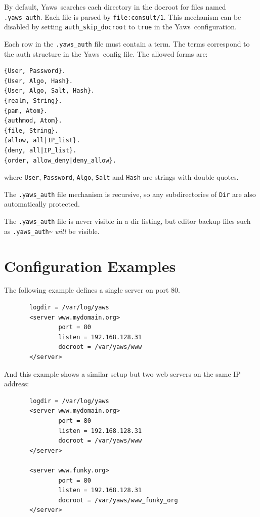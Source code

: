 \documentclass[11pt,oneside,english]{book}
\newcommand{\Yaws}            %
        {{\sc Yaws}}
\begin{document}
        By default, \Yaws\ searches each directory in the docroot for files
        named \verb+.yaws_auth+. Each file is parsed by \verb+file:consult/1+.
        This mechanism can be disabled by setting \verb+auth_skip_docroot+ to
        \verb+true+ in the \Yaws\ configuration.

        Each row in the \verb+.yaws_auth+ file must contain a term.
        The terms correspond to the auth structure in the \Yaws\ config
        file. The allowed forms are:

\begin{verbatim}
{User, Password}.
{User, Algo, Hash}.
{User, Algo, Salt, Hash}.
{realm, String}.
{pam, Atom}.
{authmod, Atom}.
{file, String}.
{allow, all|IP_list}.
{deny, all|IP_list}.
{order, allow_deny|deny_allow}.
\end{verbatim}

        where \verb+User+, \verb+Password+, \verb+Algo+, \verb+Salt+ and
        \verb+Hash+ are strings with double quotes.

        The \verb+.yaws_auth+ file mechanism is recursive, so any
        subdirectories of \verb+Dir+ are also automatically
        protected.

        The \verb+.yaws_auth+ file is never visible in a dir
        listing, but editor backup files such as
        \verb+.yaws_auth~+ \emph{will} be visible.


\section{Configuration Examples}

       The  following  example  defines a single server on
       port 80.

\begin{verbatim}
       logdir = /var/log/yaws
       <server www.mydomain.org>
               port = 80
               listen = 192.168.128.31
               docroot = /var/yaws/www
       </server>
\end{verbatim}

       And this example shows a similar setup but two web
       servers on the same IP address:

\begin{verbatim}
       logdir = /var/log/yaws
       <server www.mydomain.org>
               port = 80
               listen = 192.168.128.31
               docroot = /var/yaws/www
       </server>

       <server www.funky.org>
               port = 80
               listen = 192.168.128.31
               docroot = /var/yaws/www_funky_org
       </server>
\end{verbatim}
\end{document}
